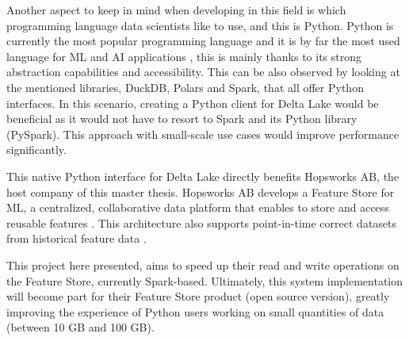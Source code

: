 Another aspect to keep in mind when developing in this field is which programming language data scientists like to use, and this is Python. Python is currently the most popular programming language \cite{TIOBEIndex} and it is by far the most used language for \gls{ML} and \gls{AI} applications \cite{python-machine-learning}, this is mainly thanks to its strong abstraction capabilities and accessibility. This can be also observed by looking at the mentioned libraries, DuckDB, Polars and Spark, that all offer Python interfaces.
In this scenario, creating a Python client for Delta Lake would be beneficial as it would not have to resort to Spark and its Python library (PySpark). This approach with small-scale use cases would improve performance significantly.

This native Python interface for Delta Lake directly benefits Hopsworks AB, the host company of this master thesis. Hopsworks AB develops a Feature Store for \gls{ML}, a centralized, collaborative data platform that enables to store and access reusable features \cite{HopsworksBatchRealtime2024}. This architecture also supports point-in-time correct datasets from historical feature data \cite{Pettersson1695672}.

This project here presented, aims to speed up their read and write operations on the Feature Store, currently Spark-based. Ultimately, this system implementation will become part for their Feature Store product (open source version), greatly improving the experience of Python users working on small quantities of data (between 10 GB and 100 GB).